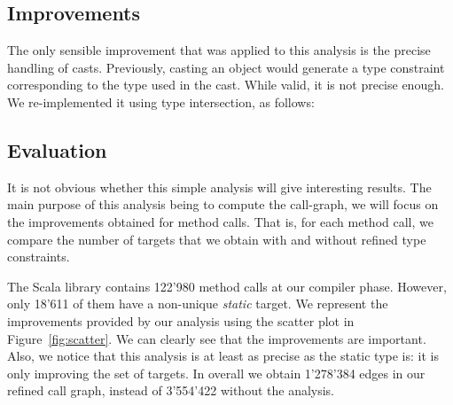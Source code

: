 \documentclass[a4paper]{article}
\begin{document}
\subsection{Improvements}
The only sensible improvement that was applied to this analysis is the precise
handling of casts. Previously, casting an object would generate a type
constraint corresponding to the type used in the cast. While valid, it is not
precise enough. We re-implemented it using type intersection, as follows:



\subsection{Evaluation}
It is not obvious whether this simple analysis will give interesting results.
The main purpose of this analysis being to compute the call-graph, we will focus
on the improvements obtained for method calls. That is, for each method call,
we compare the number of targets that we obtain with and without refined type
constraints.

The Scala library contains 122'980 method calls at our compiler phase. However,
only 18'611 of them have a non-unique \emph{static} target. We represent
the improvements provided by our analysis using the scatter plot in
Figure~\ref{fig:scatter}. We can clearly see that the improvements are
important. Also, we notice that this analysis is at least as precise as the
static type is: it is only improving the set of targets. In overall we obtain
1'278'384 edges in our refined call graph, instead of 3'554'422 without the
analysis.
\end{document}
